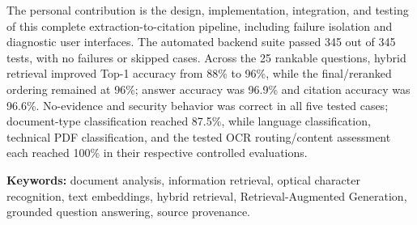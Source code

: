 The personal contribution is the design, implementation, integration, and testing of this complete extraction-to-citation pipeline, including failure isolation and diagnostic user interfaces. The automated backend suite passed 345 out of 345 tests, with no failures or skipped cases. Across the 25 rankable questions, hybrid retrieval improved Top-1 accuracy from 88\% to 96\%, while the final/reranked ordering remained at 96\%; answer accuracy was 96.9\% and citation accuracy was 96.6\%. No-evidence and security behavior was correct in all five tested cases; document-type classification reached 87.5\%, while language classification, technical PDF classification, and the tested OCR routing/content assessment each reached 100\% in their respective controlled evaluations.

\begin{flushleft}
\textbf{Keywords:} document analysis, information retrieval, optical character recognition, text embeddings, hybrid retrieval, Retrieval-Augmented Generation, grounded question answering, source provenance.
\end{flushleft}
